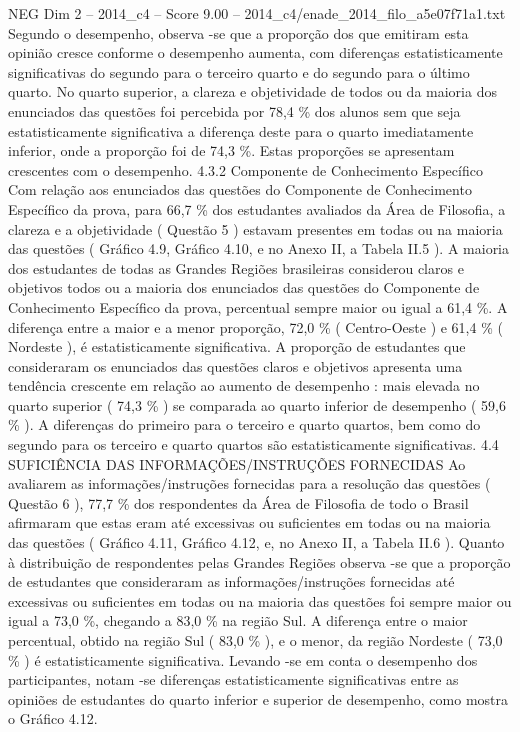 \begin{textsample}{NEG Dim 2 – 2014\_c4 – Score 9.00 – 2014\_c4/enade\_2014\_filo\_a5e07f71a1.txt}
Segundo o desempenho, observa -se que a proporção dos que emitiram esta opinião cresce conforme o desempenho aumenta, com diferenças estatisticamente significativas do segundo para o terceiro quarto e do segundo para o último quarto.
No quarto superior, a clareza e objetividade de todos ou da maioria dos enunciados das questões foi percebida por 78,4 \% dos alunos sem que seja estatisticamente significativa a diferença deste para o quarto imediatamente inferior, onde a proporção foi de 74,3 \%.
Estas proporções se apresentam crescentes com o desempenho. 4.3.2 Componente de Conhecimento Específico Com relação aos enunciados das questões do Componente de Conhecimento Específico da prova, para 66,7 \% dos estudantes avaliados da Área de Filosofia, a clareza e a objetividade ( Questão 5 ) estavam presentes em todas ou na maioria das questões ( Gráfico 4.9, Gráfico 4.10, e no Anexo II, a Tabela II.5 ).
A maioria dos estudantes de todas as Grandes Regiões brasileiras considerou claros e objetivos todos ou a maioria dos enunciados das questões do Componente de Conhecimento Específico da prova, percentual sempre maior ou igual a 61,4 \%.
A diferença entre a maior e a menor proporção, 72,0 \% ( Centro-Oeste ) e 61,4 \% ( Nordeste ), é estatisticamente significativa.
A proporção de estudantes que consideraram os enunciados das questões claros e objetivos apresenta uma tendência crescente em relação ao aumento de desempenho : mais elevada no quarto superior ( 74,3 \% ) se comparada ao quarto inferior de desempenho ( 59,6 \% ).
A diferenças do primeiro para o terceiro e quarto quartos, bem como do segundo para os terceiro e quarto quartos são estatisticamente significativas. 4.4 SUFICIÊNCIA DAS INFORMAÇÕES/INSTRUÇÕES FORNECIDAS Ao avaliarem as informações/instruções fornecidas para a resolução das questões ( Questão 6 ), 77,7 \% dos respondentes da Área de Filosofia de todo o Brasil afirmaram que estas eram até excessivas ou suficientes em todas ou na maioria das questões ( Gráfico 4.11, Gráfico 4.12, e, no Anexo II, a Tabela II.6 ).
Quanto à distribuição de respondentes pelas Grandes Regiões observa -se que a proporção de estudantes que consideraram as informações/instruções fornecidas até excessivas ou suficientes em todas ou na maioria das questões foi sempre maior ou igual a 73,0 \%, chegando a 83,0 \% na região Sul.
A diferença entre o maior percentual, obtido na região Sul ( 83,0 \% ), e o menor, da região Nordeste ( 73,0 \% ) é estatisticamente significativa.
Levando -se em conta o desempenho dos participantes, notam -se diferenças estatisticamente significativas entre as opiniões de estudantes do quarto inferior e superior de desempenho, como mostra o Gráfico 4.12.

\end{textsample}
